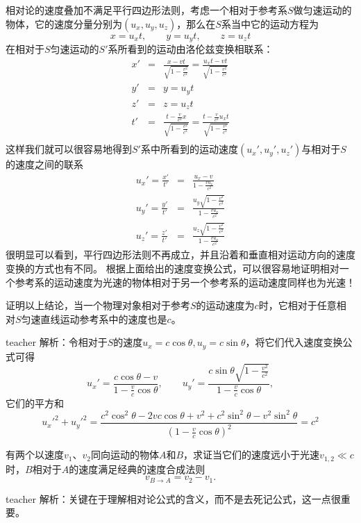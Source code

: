 相对论的速度叠加不满足平行四边形法则，考虑一个相对于参考系$S$做匀速运动的物体，它的速度分量分别为$(u_x,u_y,u_z)$，那么在$S$系当中它的运动方程为
\begin{equation}
x=u_xt,\qquad y=u_yt,\qquad z=u_zt
\end{equation}
在相对于$S$匀速运动的$S'$系所看到的运动由洛伦兹变换相联系：
\begin{eqnarray*}
x'&=&\frac{x-vt}{\sqrt{1-\frac{v^2}{c^2}}}=\frac{u_xt-vt}{\sqrt{1-\frac{v^2}{c^2}}}\\
y'&=&y=u_yt\\
z'&=&z=u_zt\\
t'&=&\frac{t-\frac{v}{c^2}x}{\sqrt{1-\frac{v^2}{c^2}}}=\frac{t-\frac{v}{c^2}u_xt}{\sqrt{1-\frac{v^2}{c^2}}}\\
\end{eqnarray*}
这样我们就可以很容易地得到$S'$系中所看到的运动速度$(u_x',u_y',u_z')$与相对于$S$的速度之间的联系
\begin{eqnarray*}
u_x'=\frac{x'}{t'}&=&\frac{u_x-v}{1-\frac{vu_x}{c^2}}\\
u_y'=\frac{y'}{t'}&=&\frac{u_y\sqrt{1-\frac{v^2}{c^2}}}{1-\frac{vu_x}{c^2}}\\
u_z'=\frac{z'}{t'}&=&\frac{u_z\sqrt{1-\frac{v^2}{c^2}}}{1-\frac{vu_x}{c^2}}
\end{eqnarray*}
很明显可以看到，平行四边形法则不再成立，并且沿着和垂直相对运动方向的速度变换的方式也有不同。
根据上面给出的速度变换公式，可以很容易地证明相对一个参考系的运动速度为光速的物体相对于另一个参考系的运动速度同样也为光速！


\begin{example}
证明以上结论，当一个物理对象相对于参考$S$的运动速度为$c$时，它相对于任意相对$S$匀速直线运动参考系中的速度也是$c$。
\begin{taggedblock}{teacher}
\noindent
解析：令相对于$S$的速度$u_x = c\cos\theta, u_y = c\sin\theta$，将它们代入速度变换公式可得
\[
u_x' = \frac{c\cos\theta-v}{1- \frac{v}{c}\cos\theta},\qquad u_y' = \frac{c\sin\theta\sqrt{1- \frac{v^2}{c^2}}}{1- \frac{v}{c}\cos\theta},
\]
它们的平方和
\[
u_x'^2+u_y'^2 = \frac{c^2\cos^2\theta-2vc\cos\theta+v^2+c^2\sin^2\theta -v^2\sin^2\theta}{(1-\frac{v}{c}\cos\theta)^2} = c^2
\]
\end{taggedblock}
\end{example}


\begin{example}

有两个以速度$v_1$、$v_2$同向运动的物体$A$和$B$，求证当它们的速度远小于光速$v_{1,2}\ll c$时，$B$相对于$A$的速度满足经典的速度合成法则
\[
v_{B\rightarrow A} = v_2-v_1.
\]
\begin{taggedblock}{teacher}
\noindent
解析：关键在于理解相对论公式的含义，而不是去死记公式，这一点很重要。
\end{taggedblock}
\end{example}



